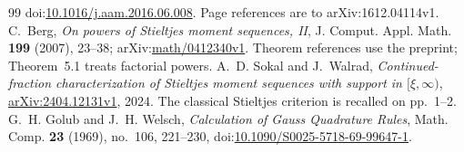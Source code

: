 \documentclass[11pt]{article}
\begin{document}
\begin{thebibliography}{99}
  doi:\href{https://doi.org/10.1016/j.aam.2016.06.008}{10.1016/j.aam.2016.06.008}.
  Page references are to arXiv:1612.04114v1.
 C.~Berg, \emph{On powers of Stieltjes moment sequences, II},
  J. Comput. Appl. Math. \textbf{199} (2007), 23--38;
  arXiv:\href{https://arxiv.org/abs/math/0412340v1}{math/0412340v1}.
  Theorem references use the preprint; Theorem~5.1 treats factorial powers.
 A.~D. Sokal and J.~Walrad,
  \emph{Continued-fraction characterization of Stieltjes moment sequences
  with support in $[\xi,\infty)$},
  \href{https://arxiv.org/abs/2404.12131v1}{arXiv:2404.12131v1}, 2024.
  The classical Stieltjes criterion is recalled on pp.~1--2.
 G.~H. Golub and J.~H. Welsch,
  \emph{Calculation of Gauss Quadrature Rules}, Math. Comp. \textbf{23}
  (1969), no.~106, 221--230,
  doi:\href{https://doi.org/10.1090/S0025-5718-69-99647-1}{10.1090/S0025-5718-69-99647-1}.
\end{thebibliography}

\companionpapercontext
\end{document}
